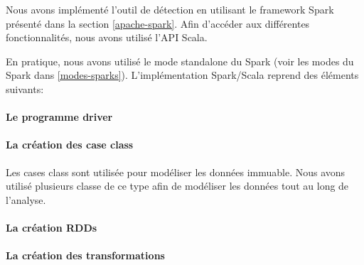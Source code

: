 Nous avons implémenté l'outil de détection en utilisant le framework Spark présenté dans la section \ref{apache-spark}. Afin d'accéder aux différentes fonctionnalités, nous avons utilisé l'API Scala.

\begin{comment}
vérifeir la description du driver dans la présentation du Spark
\end{comment}
En pratique, nous avons utilisé le mode standalone du Spark (voir les modes du Spark dans \ref{modes-sparks}). L'implémentation Spark/Scala reprend des éléments suivants:

\paragraph{Le programme driver}

\paragraph{La création des case class}
Les cases class sont utilisée pour modéliser les données immuable.  Nous avons utilisé plusieurs classe de ce type afin de modéliser les données tout au long de l'analyse.

\paragraph{La création  RDDs}

\paragraph{La création des transformations}




